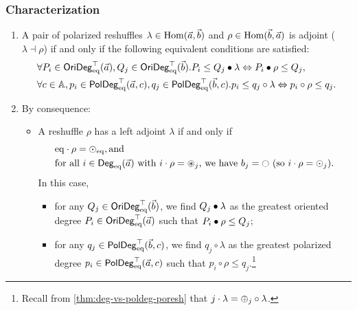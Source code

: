 \documentclass[a4paper]{memoir}
\begin{document}
\subsubsection{Characterization}
\begin{theorem}\label{thm:poresh-adjoint}
	\begin{enumerate}
		\item A pair of polarized reshuffles $\lambda \in {\mathrm{Hom}}(\vec a, \vec b)$ and $\rho \in {\mathrm{Hom}}(\vec b, \vec a)$ is adjoint ($\lambda \dashv \rho$) if and only if the following equivalent conditions are satisfied:
		\begin{align}
			&\forall P_i \in \mathsf{OriDeg}_{\mathrm{eq}}^\top(\vec a), Q_j \in \mathsf{OriDeg}_{\mathrm{eq}}^\top(\vec b). P_i \leq Q_j \mathbin{\bullet} \lambda \Leftrightarrow P_i \mathbin{\bullet} \rho \leq Q_j,
			\label{eq:poresh-adjoint-crit-orideg}
			\\
			&\forall c \in {\mathbb{A}}, p_i \in \mathsf{PolDeg}_{\mathrm{eq}}^\top(\vec a, c), q_j \in \mathsf{PolDeg}_{\mathrm{eq}}^\top(\vec b, c). p_i \leq q_j \circ \lambda \Leftrightarrow p_i \circ \rho \leq q_j.
			\label{eq:poresh-adjoint-crit-poldeg}
		\end{align}
		\item By consequence:
		\begin{itemize}
			\item A reshuffle $\rho$ has a left adjoint $\lambda$ if and only if
			\begin{align}
				&\eqtydeg \cdot \rho = \nonpol_\eqtydeg, \text{and} \label{eq:poresh-withl-crit1} \\
				&\text{for all } i \in \Degeq(\vec a) \text{ with } i \cdot \rho = \isopol_j \text{, we have } b_j = \npolar \text{ (so $i \cdot \rho = \nonpol_j$)}. \label{eq:poresh-withl-crit2}
			\end{align}
			In this case,
			\begin{itemize}
				\item for any $Q_j \in \mathsf{OriDeg}_{\mathrm{eq}}^\top(\vec b)$, we find $Q_j \mathbin{\bullet} \lambda$ as the greatest oriented degree $P_i \in \mathsf{OriDeg}_{\mathrm{eq}}^\top(\vec a)$ such that $P_i \mathbin{\bullet} \rho \leq Q_j$;
				\item for any $q_j \in \mathsf{PolDeg}_{\mathrm{eq}}^\top(\vec b, c)$, we find $q_j \circ \lambda$ as the greatest polarized degree $p_i \in \mathsf{PolDeg}_{\mathrm{eq}}^\top(\vec a, c)$ such that $p_i \circ \rho \leq q_j$.\footnote{Recall from \cref{thm:deg-vs-poldeg-poresh} that $j \cdot \lambda = {\oplus}_j \circ \lambda$.}
			\end{itemize}
			

\end{itemize}
\end{enumerate}
\end{theorem}
\end{document}
